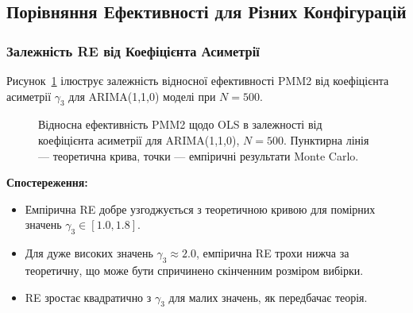 \documentclass[12pt,a4paper]{article}
\begin{document}
\subsection{Порівняння Ефективності для Різних Конфігурацій}
\label{subsec:efficiency_comparison}

\subsubsection{Залежність RE від Коефіцієнта Асиметрії}

Рисунок~\ref{fig:re_vs_skewness} ілюструє залежність відносної ефективності PMM2 від коефіцієнта асиметрії $\gamma_3$ для ARIMA(1,1,0) моделі при $N = 500$.

\begin{figure}[h]
\centering
{}
\caption{Відносна ефективність PMM2 щодо OLS в залежності від коефіцієнта асиметрії для ARIMA(1,1,0), $N=500$. Пунктирна лінія --- теоретична крива, точки --- емпіричні результати Monte Carlo.}
\label{fig:re_vs_skewness}
\end{figure}

\textbf{Спостереження:}
\begin{itemize}
    \item Емпірична RE добре узгоджується з теоретичною кривою для помірних значень $\gamma_3 \in [1.0, 1.8]$.
    \item Для дуже високих значень $\gamma_3 \approx 2.0$, емпірична RE трохи нижча за теоретичну, що може бути спричинено скінченним розміром вибірки.
    \item RE зростає квадратично з $\gamma_3$ для малих значень, як передбачає теорія.
\end{itemize}
\end{document}
